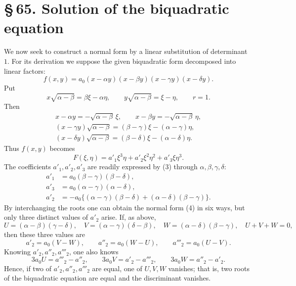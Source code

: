 \documentclass[11pt]{article}
\providecommand{\sect}[2]{\section*{\S\,#1. #2}}
\begin{document}
\sect{65}{Solution of the biquadratic equation}

We now seek to construct a normal form by a linear substitution of determinant $1$. For its derivation we suppose the given biquadratic form decomposed into linear factors:
\begin{equation}
 f(x,y)=a_0(x-\alpha y)(x-\beta y)(x-\gamma y)(x-\delta y).
\tag{1}
\end{equation}
Put
\begin{equation}
 x\sqrt{\alpha-\beta}=\beta\xi-\alpha\eta,
 \qquad
 y\sqrt{\alpha-\beta}=\xi-\eta,
 \qquad r=1.
\tag{2}
\end{equation}
Then
\begin{equation}
\begin{gathered}
 x-\alpha y=-\sqrt{\alpha-\beta}\,\xi,
 \qquad
 x-\beta y=-\sqrt{\alpha-\beta}\,\eta,\\
 (x-\gamma y)\sqrt{\alpha-\beta}=(\beta-\gamma)\xi-(\alpha-\gamma)\eta,\\
 (x-\delta y)\sqrt{\alpha-\beta}=(\beta-\delta)\xi-(\alpha-\delta)\eta.
\end{gathered}
\tag{3}
\end{equation}
Thus $f(x,y)$ becomes
\begin{equation}
 F(\xi,\eta)=a'_1\xi^3\eta+a'_2\xi^2\eta^2+a'_3\xi\eta^3.
\tag{4}
\end{equation}
The coefficients $a'_1,a'_2,a'_3$ are readily expressed by (3) through $\alpha,\beta,\gamma,\delta$:
\begin{equation}
\begin{aligned}
 a'_1&=a_0(\beta-\gamma)(\beta-\delta),\\
 a'_3&=a_0(\alpha-\gamma)(\alpha-\delta),\\
 a'_2&=-a_0\{(\alpha-\gamma)(\beta-\delta)+(\alpha-\delta)(\beta-\gamma)\}.
\end{aligned}
\tag{5}
\end{equation}
By interchanging the roots one can obtain the normal form (4) in six ways, but only three distinct values of $a'_2$ arise. If, as above,
\begin{equation}
 U=(\alpha-\beta)(\gamma-\delta),
 \quad
 V=(\alpha-\gamma)(\delta-\beta),
 \quad
 W=(\alpha-\delta)(\beta-\gamma),
 \quad
 U+V+W=0,
\tag{6}
\end{equation}
then these three values are
\begin{equation}
 a'_2=a_0(V-W),
 \qquad
 a''_2=a_0(W-U),
 \qquad
 a'''_2=a_0(U-V).
\tag{7}
\end{equation}
Knowing $a'_2,a''_2,a'''_2$, one also knows
\begin{equation}
 3a_0U=a'''_2-a''_2,
 \qquad
 3a_0V=a'_2-a'''_2,
 \qquad
 3a_0W=a''_2-a'_2.
\tag{8}
\end{equation}
Hence, if two of $a'_2,a''_2,a'''_2$ are equal, one of $U,V,W$ vanishes; that is, two roots of the biquadratic equation are equal and the discriminant vanishes.
\end{document}
